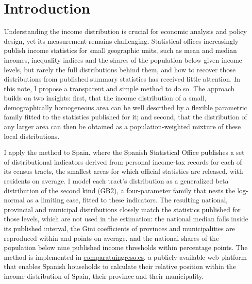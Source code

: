 \documentclass[letterpaper,11pt,leqno]{article}
\begin{document}
\thispagestyle{empty}

\newpage

\setcounter{page}{1}

\section{Introduction}

Understanding the income distribution is crucial for economic analysis and policy design, yet its measurement remains challenging. Statistical offices increasingly publish income statistics for small geographic units, such as mean and median incomes, inequality indices and the shares of the population below given income levels, but rarely the full distributions behind them, and how to recover those distributions from published summary statistics has received little attention. In this note, I propose a transparent and simple method to do so. The approach builds on two insights: first, that the income distribution of a small, demographically homogeneous area can be well described by a flexible parametric family fitted to the statistics published for it; and second, that the distribution of any larger area can then be obtained as a population-weighted mixture of these local distributions.

I apply the method to Spain, where the Spanish Statistical Office publishes a set of distributional indicators derived from personal income-tax records for each of its \TractsTotal{} census tracts, the smallest areas for which official statistics are released, with \TractPopMean{} residents on average. I model each tract's distribution as a generalized beta distribution of the second kind (GB2), a four-parameter family that nests the log-normal as a limiting case, fitted to these indicators. The resulting national, provincial and municipal distributions closely match the statistics published for those levels, which are not used in the estimation: the national median falls inside its published interval, the Gini coefficients of provinces and municipalities are reproduced within \ProvGiniAbsErr{} and \MunGiniAbsErr{} points on average, and the national shares of the population below nine published income thresholds within \ThrAllMaxDiff{} percentage points. The method is implemented in \href{https://comparatuingreso.es/}{\mbox{comparatuingreso.es}}, a publicly available web platform that enables Spanish households to calculate their relative position within the income distribution of Spain, their province and their municipality.
\end{document}
